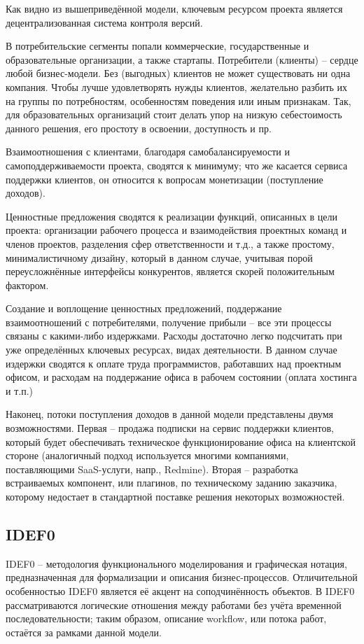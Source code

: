 \documentclass[a4paper, 14pt]{extarticle}
\begin{document}
Как видно из вышеприведённой модели, ключевым ресурсом проекта является децентрализованная система контроля версий. %

В потребительские сегменты попали коммерческие, государственные и образовательные организации, а также стартапы. Потребители (клиенты) – сердце любой бизнес-модели. Без (выгодных) клиентов не может существовать ни одна компания. Чтобы лучше удовлетворять нужды клиентов, желательно разбить их на группы по потребностям, особенностям поведения или иным признакам. Так, для образовательных организаций стоит делать упор на низкую себестоимость данного решения, его простоту в освоении, доступность и пр.

Взаимоотношения с клиентами, благодаря самобалансируемости и самоподдерживаемости проекта, сводятся к минимуму; что же касается сервиса поддержки клиентов, он относится к вопросам монетизации (поступление доходов).

Ценностные предложения сводятся к реализации функций, описанных в цели проекта: организации рабочего процесса и взаимодействия проектных команд и членов проектов, разделения сфер ответственности и т.д., а также простому, минималистичному дизайну, который в данном случае, учитывая порой переусложнённые интерфейсы конкурентов, является скорей положительным фактором.

Создание и воплощение ценностных предложений, поддержание взаимоотношений с потребителями, получение прибыли – все эти процессы связаны с какими-либо издержками. Расходы достаточно легко подсчитать при уже определённых ключевых ресурсах, видах деятельности. В данном случае издержки сводятся к оплате труда программистов, работавших над проектным офисом, и расходам на поддержание офиса в рабочем состоянии (оплата хостинга и т.п.)

Наконец, потоки поступления доходов в данной модели представлены двумя возможностями. Первая -- продажа подписки на сервис поддержки клиентов, который будет обеспечивать техническое функционирование офиса на клиентской стороне (аналогичный подход используется многими компаниями, поставляющими SaaS-услуги, напр., Redmine). Вторая -- разработка встраиваемых компонент, или плагинов, по техническому заданию заказчика, которому недостает в стандартной поставке решения некоторых возможностей.

\newpage


\subsection{IDEF0}
IDEF0 -- методология функционального моделирования и графическая нотация, предназначенная для формализации и описания бизнес-процессов. Отличительной особенностью IDEF0 является её акцент на соподчинённость объектов. В IDEF0 рассматриваются логические отношения между работами без учёта временной последовательности; таким образом, описание workflow, или потока работ, остаётся за рамками данной модели.
\end{document}
